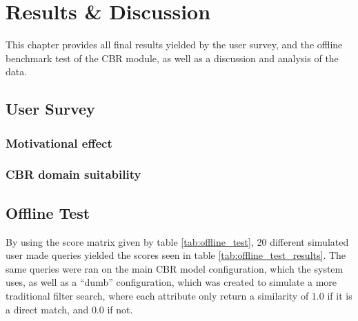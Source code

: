 
\chapter{Results \& Discussion}

This chapter provides all final results yielded by the user survey, and the offline benchmark test of the CBR module, as well as a discussion and analysis of the data.

\section{User Survey}


\subsection{Motivational effect}


\subsection{CBR domain suitability}




\section{Offline Test}

By using the score matrix given by table \ref{tab:offline_test}, 20 different simulated user made queries yielded the scores seen in table \ref{tab:offline_test_results}. The same queries were ran on the main CBR model configuration, which the system uses, as well as a \enquote{dumb} configuration, which was created to simulate a more traditional filter search, where each attribute only return a similarity of $1.0$ if it is a direct match, and $0.0$ if not.

